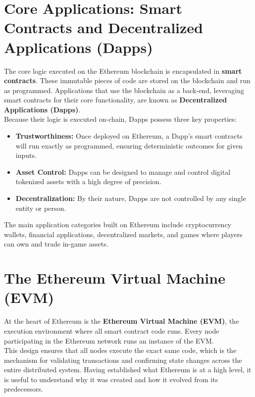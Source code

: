 \documentclass{scrbook}
\begin{document}
\section{Core Applications: Smart Contracts and Decentralized Applications (Dapps)}

The core logic executed on the Ethereum blockchain is encapsulated in \textbf{smart contracts}. These immutable pieces of code are stored on the blockchain and run as programmed. Applications that use the blockchain as a back-end, leveraging smart contracts for their core functionality, are known as \textbf{Decentralized Applications (Dapps)}. \\

Because their logic is executed on-chain, Dapps possess three key properties:

\begin{itemize}
    \item \textbf{Trustworthiness:} Once deployed on Ethereum, a Dapp's smart contracts will run exactly as programmed, ensuring deterministic outcomes for given inputs.
    \item \textbf{Asset Control:} Dapps can be designed to manage and control digital tokenized assets with a high degree of precision.
    \item \textbf{Decentralization:} By their nature, Dapps are not controlled by any single entity or person.
\end{itemize}

The main application categories built on Ethereum include cryptocurrency wallets, financial applications, decentralized markets, and games where players can own and trade in-game assets.

\section{The Ethereum Virtual Machine (EVM)}

At the heart of Ethereum is the \textbf{Ethereum Virtual Machine (EVM)}, the execution environment where all smart contract code runs. Every node participating in the Ethereum network runs an instance of the EVM. \\

This design ensures that all nodes execute the exact same code, which is the mechanism for validating transactions and confirming state changes across the entire distributed system. Having established what Ethereum is at a high level, it is useful to understand why it was created and how it evolved from its predecessors.
\end{document}
